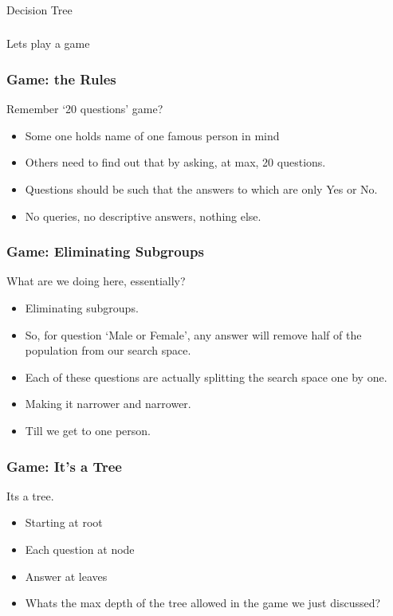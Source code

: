 \begin{frame}[fragile]\frametitle{}
\begin{center}
{\Large Decision Tree}
\end{center}
\end{frame}


\begin{frame}[fragile]\frametitle{}
\begin{center}
{\Large Lets play a game}
\end{center}
\end{frame}


\begin{frame}[fragile]\frametitle{Game: the Rules}
Remember `20 questions' game?
\begin{itemize}
	\item Some one holds name of one famous person in mind
	\item Others need to find out that by asking, at max, 20 questions.
	\item Questions should be such that the answers to which are only Yes or No.
	\item No queries, no descriptive answers, nothing else.
	\end{itemize}
\end{frame}

\begin{frame}[fragile]\frametitle{Game: Eliminating Subgroups}
What are we doing here, essentially?
\begin{itemize}
	\item Eliminating subgroups.
	\item So, for question `Male or Female', any answer will remove half of the population from our search space.
	\item Each of these questions are actually splitting the search space one by one.
	\item Making it narrower and narrower.
	\item Till we get to one person.
	\end{itemize}
\end{frame}

\begin{frame}[fragile]\frametitle{Game: It's a Tree}
Its a tree.
\begin{itemize}
	\item Starting at root
	\item Each question at node
	\item Answer at leaves
	\item Whats the max depth of the tree allowed in the game we just discussed?
	\end{itemize}
\end{frame}

